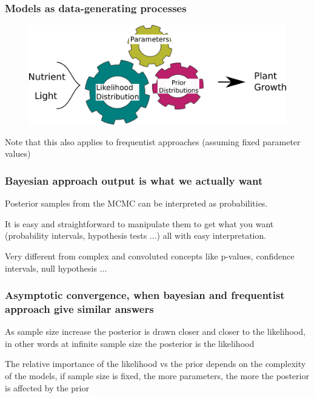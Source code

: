 \documentclass{beamer}
\begin{document}
 \begin{frame}
  \frametitle{\bf Models as data-generating processes}
  
  \begin{figure}
   \includegraphics[width=\textwidth,height=.7\textheight,keepaspectratio]{cogs_f.png}
  \end{figure}

  Note that this also applies to frequentist approaches (assuming fixed parameter values)
  
 \end{frame}

 
  \begin{frame}
  \frametitle{\bf Bayesian approach output is what we actually want}
  
  Posterior samples from the MCMC can be interpreted as probabilities.\\
  
  \vspace*{0.3cm}
  
  It is easy and straightforward to manipulate them to get what you want (probability intervals, hypothesis tests ...) all with easy interpretation.\\
  
  \vspace*{0.3cm}
  
  Very different from complex and convoluted concepts like p-values, confidence intervals, null hypothesis ...
  
  
 \end{frame}
 
  \begin{frame}
  \frametitle{\bf Asymptotic convergence, when bayesian and frequentist approach give similar answers}
  
  As sample size increase the posterior is drawn closer and closer to the likelihood, in other words at infinite sample size the posterior is the likelihood
  
  \vspace*{0.3cm}
  
  The relative importance of the likelihood vs the prior depends on the complexity of the models, if sample size is fixed, the more parameters, the more the posterior is affected by the prior
  
  
 \end{frame}
 
\end{document}

